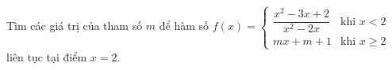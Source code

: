 \begin{ex}
Tìm các giá trị của tham số $m$ để hàm số $f(x)=\begin{cases}\dfrac{x^2-3x+2}{x^2-2x}&\text{khi }x<2\\mx+m+1&\text{khi }x\ge2\end{cases}$ liên tục tại điểm $x=2$.
\end{ex}
